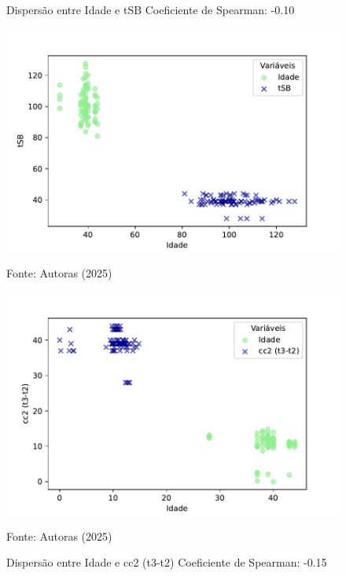 \begin{figure}[h]
    \captionsetup{font=footnotesize, justification=centering, labelsep=period, position=above}
    \centering
    \begin{minipage}[b]{0.45\linewidth}
        \caption{Dispersão entre Idade e tSB Coeficiente de Spearman: -0.10}
        \label{fig:idade-tSB}
        \centering
        \includegraphics[scale=0.47]{figuras/Spearman/idade-tSB.pdf}
        \vspace{0.3cm}
        \begin{minipage}{\linewidth}
            \centering
            \scriptsize{Fonte: Autoras (2025)}
        \end{minipage}
    \end{minipage}
    \hspace{0.05\linewidth}
    \begin{minipage}[b]{0.45\linewidth}
        \caption{Dispersão entre Idade e cc2 (t3-t2) Coeficiente de Spearman: -0.15}
        \label{fig:idade-cc2}
        \centering
        \includegraphics[scale=0.35]{figuras/Spearman/idade-cc2.pdf}
        \vspace{0.3cm}
        \begin{minipage}{\linewidth}
            \centering
            \scriptsize{Fonte: Autoras (2025)}
        \end{minipage}
    \end{minipage}
\end{figure}
\FloatBarrier

